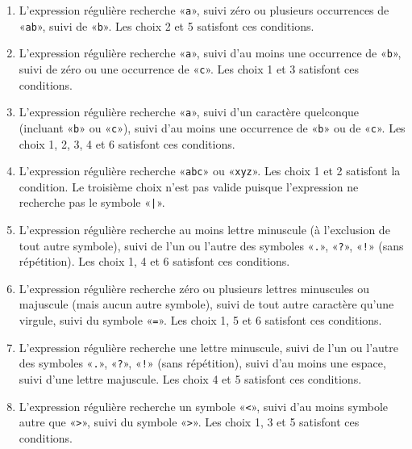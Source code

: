 \begin{exercice}
  \begin{sol}
    \begin{enumerate}
    \item L'expression régulière recherche «\verb=a=», suivi zéro ou
      plusieurs occurrences de «\verb=ab=», suivi de «\verb=b=». Les
      choix 2 et 5 satisfont ces conditions.
    \item L'expression régulière recherche «\verb=a=», suivi d'au
      moins une occurrence de «\verb=b=», suivi de zéro ou une
      occurrence de «\verb=c=». Les choix 1 et 3 satisfont ces
      conditions.
    \item L'expression régulière recherche «\verb=a=», suivi d'un
      caractère quelconque (incluant «\verb=b=» ou «\verb=c=»), suivi
      d'au moins une occurrence de «\verb=b=» ou de «\verb=c=». Les
      choix 1, 2, 3, 4 et 6 satisfont ces conditions.
    \item L'expression régulière recherche «\verb=abc=» ou
      «\verb=xyz=». Les choix 1 et 2 satisfont la condition. Le
      troisième choix n'est pas valide puisque l'expression ne
      recherche pas le symbole «\verb=|=».
    \item L'expression régulière recherche au moins lettre minuscule
      (à l'exclusion de tout autre symbole), suivi de l'un ou l'autre
      des symboles «\verb=.=», «\verb=?=», «\verb=!=» (sans
      répétition). Les choix 1, 4 et 6 satisfont ces conditions.
    \item L'expression régulière recherche zéro ou plusieurs lettres
      minuscules ou majuscule (mais aucun autre symbole), suivi de
      tout autre caractère qu'une virgule, suivi du symbole
      «\verb|=|». Les choix 1, 5 et 6 satisfont ces conditions.
    \item L'expression régulière recherche une lettre minuscule, suivi
      de l'un ou l'autre des symboles «\verb=.=», «\verb=?=»,
      «\verb=!=» (sans répétition), suivi d'au moins une espace, suivi
      d'une lettre majuscule. Les choix 4 et 5 satisfont ces
      conditions.
    \item L'expression régulière recherche un symbole «\verb=<=»,
      suivi d'au moins symbole autre que «\verb=>=», suivi du symbole
      «\verb=>=». Les choix 1, 3 et 5 satisfont ces conditions.
    \end{enumerate}
  \end{sol}
\end{exercice}

